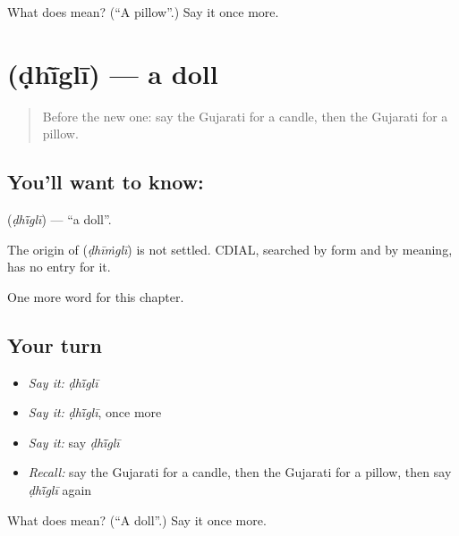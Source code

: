 \begin{tcolorbox}[breakable,colback=teal!4,colframe=teal!35!black,title={Before you move on}]
What does  mean? (\textquotedblleft{}A pillow\textquotedblright{}.) Say it once more.
\end{tcolorbox}
\section[\texorpdfstring{\gu{ઢીંગલી} (ḍhī̃glī)}{ઢીંગલી (ḍhī̃glī)}]{ (ḍhī̃glī) — a doll}

\label{lesson:GU-C110-dhigli}



\begin{quote}
Before the new one: say the Gujarati for a candle, then the Gujarati for a pillow.
\end{quote}

\subsection*{You'll want to know: }
\textbf{} (\emph{ḍhī̃glī}) — \textquotedblleft{}a doll\textquotedblright{}.

\begin{cousinweb}
The origin of \textbf{} (\emph{ḍhīṁglī}) is not settled. CDIAL, searched by form and by meaning, has no entry for it.
\end{cousinweb}

\begin{grammarlens}[title={What you've built}]
One more word for this chapter.
\end{grammarlens}

\subsection*{Your turn}
\begin{itemize}
\raggedright
  \item \emph{Say it:} \emph{ḍhī̃glī}
  \item \emph{Say it:} \emph{ḍhī̃glī}, once more
  \item \emph{Say it:} say \emph{ḍhī̃glī}
  \item \emph{Recall:} say the Gujarati for a candle, then the Gujarati for a pillow, then say \emph{ḍhī̃glī} again
\end{itemize}

\begin{tcolorbox}[breakable,colback=teal!4,colframe=teal!35!black,title={Before you move on}]
What does  mean? (\textquotedblleft{}A doll\textquotedblright{}.) Say it once more.
\end{tcolorbox}
